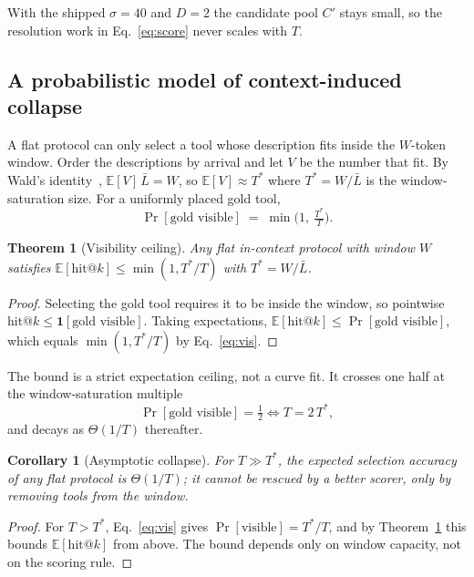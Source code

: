\documentclass[11pt]{article}
\theoremstyle{plain}
\newtheorem{theorem}{Theorem}
\newtheorem{corollary}{Corollary}
\theoremstyle{definition}
\begin{document}
With the shipped $\sigma=40$ and $D=2$ the candidate pool $C'$ stays small, so
the resolution work in Eq.~\eqref{eq:score} never scales with $T$.

\subsection{A probabilistic model of context-induced collapse}
\label{sec:collapse}
A flat protocol can only select a tool whose description fits inside the
$W$-token window. Order the descriptions by arrival and let $V$ be the number
that fit. By Wald's identity~\citep{wald1947sequential},
$\mathbb{E}[V]\,\bar L = W$, so $\mathbb{E}[V]\approx T^{*}$ where
$T^{*}=W/\bar L$ is the window-saturation size. For a uniformly placed gold tool,
\begin{equation}
\label{eq:vis}
\Pr[\text{gold visible}] \;=\; \min\!\Big(1,\ \tfrac{T^{*}}{T}\Big).
\end{equation}

\begin{theorem}[Visibility ceiling]
\label{thm:vis}
Any flat in-context protocol with window $W$ satisfies
$\mathbb{E}[\text{hit@}k] \le \min(1, T^{*}/T)$ with $T^{*}=W/\bar L$.
\end{theorem}
\begin{proof}
Selecting the gold tool requires it to be inside the window, so pointwise
$\text{hit@}k \le \mathbf{1}[\text{gold visible}]$. Taking expectations,
$\mathbb{E}[\text{hit@}k] \le \Pr[\text{gold visible}]$, which equals
$\min(1,T^{*}/T)$ by Eq.~\eqref{eq:vis}.
\end{proof}

The bound is a strict expectation ceiling, not a curve fit. It crosses one half
at the window-saturation multiple
\begin{equation}
\label{eq:cliff}
\Pr[\text{gold visible}] = \tfrac{1}{2} \iff T = 2\,T^{*},
\end{equation}
and decays as $\Theta(1/T)$ thereafter.

\begin{corollary}[Asymptotic collapse]
\label{cor:cliff}
For $T \gg T^{*}$, the expected selection accuracy of any flat protocol is
$\Theta(1/T)$; it cannot be rescued by a better scorer, only by removing tools
from the window.
\end{corollary}
\begin{proof}
For $T>T^{*}$, Eq.~\eqref{eq:vis} gives $\Pr[\text{visible}] = T^{*}/T$, and by
Theorem~\ref{thm:vis} this bounds $\mathbb{E}[\text{hit@}k]$ from above. The bound
depends only on window capacity, not on the scoring rule.
\end{proof}
\end{document}

